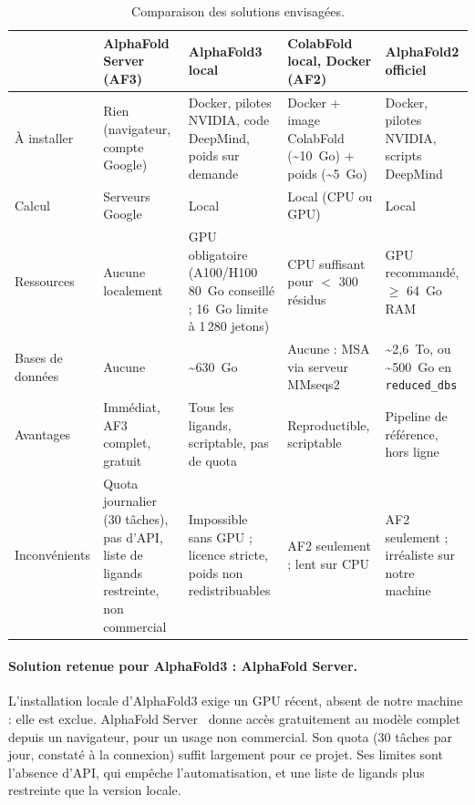 \begin{table}[H]
\centering
\footnotesize
\begin{tabularx}{\textwidth}{>{\raggedright\arraybackslash}p{2.2cm}>{\raggedright\arraybackslash}X>{\raggedright\arraybackslash}X>{\raggedright\arraybackslash}X>{\raggedright\arraybackslash}X}
\toprule
 & \textbf{AlphaFold Server (AF3)}~\cite{alphafold_server} & \textbf{AlphaFold3 local}~\cite{alphafold3_github} & \textbf{ColabFold local, Docker (AF2)}~\cite{colabfold_github} & \textbf{AlphaFold2 officiel}~\cite{alphafold_github} \\
\midrule
À installer & Rien (navigateur, compte Google) & Docker, pilotes NVIDIA, code DeepMind, poids sur demande & Docker + image ColabFold (\textasciitilde 10~Go) + poids (\textasciitilde 5~Go) & Docker, pilotes NVIDIA, scripts DeepMind \\
Calcul & Serveurs Google & Local & Local (CPU ou GPU) & Local \\
Ressources & Aucune localement & GPU obligatoire (A100/H100 80~Go conseillé ; 16~Go limite à 1\,280 jetons) & CPU suffisant pour $<$ 300 résidus & GPU recommandé, $\geq$ 64~Go RAM \\
Bases de données & Aucune & \textasciitilde 630~Go & Aucune : MSA via serveur MMseqs2 & \textasciitilde 2,6~To, ou \textasciitilde 500~Go en \texttt{reduced\_dbs} \\
Avantages & Immédiat, AF3 complet, gratuit & Tous les ligands, scriptable, pas de quota & Reproductible, scriptable & Pipeline de référence, hors ligne \\
Inconvénients & Quota journalier (30 tâches), pas d'API, liste de ligands restreinte, non commercial & Impossible sans GPU ; licence stricte, poids non redistribuables & AF2 seulement ; lent sur CPU & AF2 seulement ; irréaliste sur notre machine \\
\bottomrule
\end{tabularx}
\caption{Comparaison des solutions envisagées.}
\label{tab:solutions}
\end{table}

\paragraph{Solution retenue pour AlphaFold3 : AlphaFold Server.} L'installation locale d'AlphaFold3 exige un GPU récent, absent de notre machine : elle est exclue. AlphaFold Server~\cite{alphafold_server} donne accès gratuitement au modèle complet depuis un navigateur, pour un usage non commercial. Son quota (30 tâches par jour, constaté à la connexion) suffit largement pour ce projet. Ses limites sont l'absence d'API, qui empêche l'automatisation, et une liste de ligands plus restreinte que la version locale.

